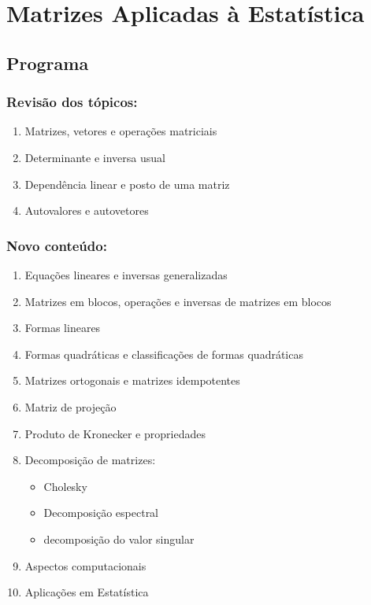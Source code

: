\chapter[Matrizes Aplicadas à Estatística]{Matrizes Aplicadas à Estatística}
\label{ch:applied_matrices}


\section[Programa da disciplina]{Programa}\label{sec:matrices_program}

\subsection{Revisão dos tópicos:}
\begin{enumerate}
  \item {Matrizes, vetores e operações matriciais}
  \item {Determinante e inversa usual}
  \item {Dependência linear e posto de uma matriz}
  \item {Autovalores e autovetores}
\end{enumerate}

\subsection{Novo conteúdo:}
\begin{enumerate}
  \item {Equações lineares e inversas generalizadas}
  \item {Matrizes em blocos, operações e inversas de matrizes em blocos}
  \item {Formas lineares}
  \item {Formas quadráticas e classificações de formas quadráticas}
  \item {Matrizes ortogonais e matrizes idempotentes}
  \item {Matriz de projeção}
  \item {Produto de Kronecker e propriedades}
  \item {Decomposição de matrizes:}
  \begin{itemize}
    \item {Cholesky}
    \item {Decomposição espectral}
    \item {decomposição do valor singular}
  \end{itemize}
  \item {Aspectos computacionais}
  \item {Aplicações em Estatística}
\end{enumerate}

